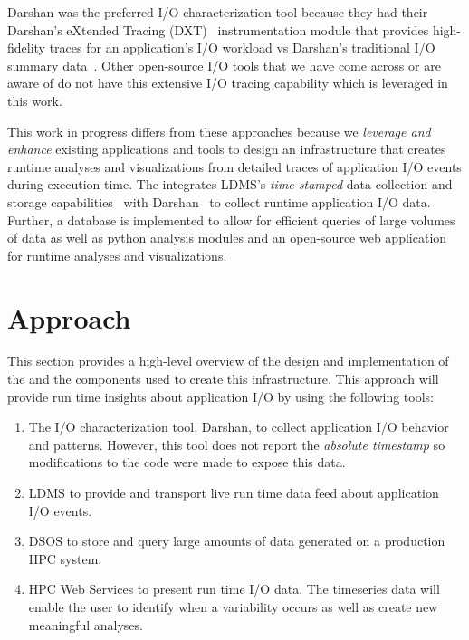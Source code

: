 \documentclass[conference]{IEEEtran}
\begin{document}
Darshan was the preferred I/O characterization tool because they had their Darshan's eXtended Tracing (DXT)~\cite{darshan-runtime} instrumentation module that provides high-fidelity traces for an application's I/O workload vs Darshan's traditional I/O summary data~\cite{darshan-runtime}. Other open-source I/O tools that we have come across or are aware of do not have this extensive I/O tracing capability which is leveraged in this work.

This work in progress differs from these approaches because we \emph{leverage and enhance} existing applications and tools to design an infrastructure that creates runtime analyses and visualizations from detailed traces of application I/O events during execution time. The \Darshan integrates LDMS's \emph{time stamped} data collection and storage capabilities~\cite{ldmsgithub} with Darshan~\cite{darshan-webpage} to collect runtime application I/O data. Further, a database is implemented to allow for efficient queries of large volumes of data as well as python analysis modules and an open-source web application for runtime analyses and visualizations.

\section{Approach}

This section provides a high-level overview of the design and implementation of the \Darshan and the components used to create this infrastructure. 
This approach will provide run time insights about application I/O by using the following tools:
\begin{enumerate}
    \item The I/O characterization tool, Darshan, to collect application I/O behavior and patterns. However, this tool does not report the \emph{absolute timestamp} so modifications to the code were made to expose this data.
    \item LDMS to provide and transport live run time data feed about application I/O events.~\cite{ldmsgithubwiki}
    \item DSOS to store and query large amounts of data generated on a production HPC system.~\cite{sosgithub}
    \item HPC Web Services to present run time I/O data. The timeseries data will enable the user to identify when a variability occurs as well as create new meaningful analyses.~\cite{ClusterAV}
\end{enumerate}
\end{document}
